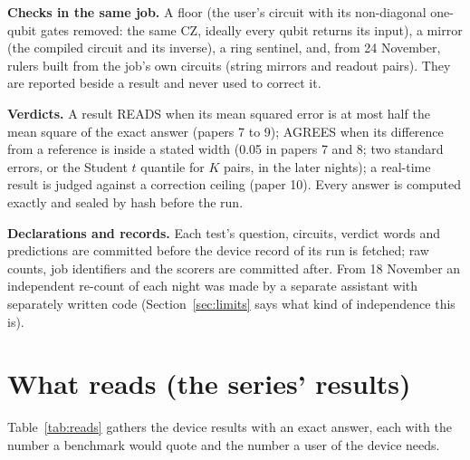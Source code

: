 \documentclass[10pt,a4paper]{article}
\begin{document}
\textbf{Checks in the same job.} A floor (the user's circuit with its non-diagonal one-qubit gates removed: the same CZ,
ideally every qubit returns its input), a mirror (the compiled circuit and its inverse), a ring sentinel, and, from 24 November,
rulers built from the job's own circuits (string mirrors and readout pairs). They are reported beside a result and never
used to correct it.

\textbf{Verdicts.} A result READS when its mean squared error is at most half the mean square of the exact answer
(papers 7 to 9); AGREES when its difference from a reference is inside a stated width (0.05 in papers 7 and 8; two
standard errors, or the Student $t$ quantile for $K$ pairs, in the later nights); a real-time result is judged against a correction ceiling (paper 10). Every
answer is computed exactly and sealed by hash before the run.

\textbf{Declarations and records.} Each test's question, circuits, verdict words and predictions are committed before
the device record of its run is fetched; raw counts, job identifiers and the scorers are committed after. From
18 November an independent re-count of each night was made by a separate assistant with separately written code
(Section~\ref{sec:limits} says what kind of independence this is).

\section{What reads (the series' results)}\label{sec:reads}
Table~\ref{tab:reads} gathers the device results with an exact answer, each with the number a benchmark would quote and
the number a user of the device needs.
\end{document}
